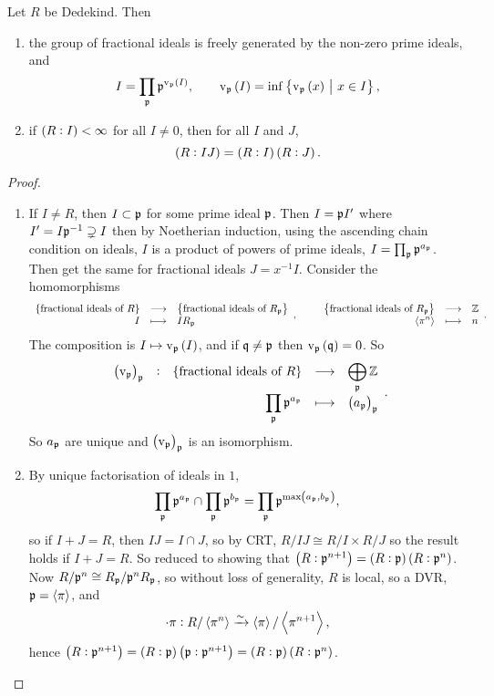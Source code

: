 \begin{theorem}
Let $ R $ be Dedekind. Then
\begin{enumerate}
\item the group of fractional ideals is freely generated by the non-zero prime ideals, and
$$ I = \prod_\ppp \ppp^{\v_\ppp\br{I}}, \qquad \v_\ppp\br{I} = \inf \cbr{\v_\ppp\br{x} \st x \in I}, $$
\item if $ \br{R : I} < \infty $ for all $ I \ne 0 $, then for all $ I $ and $ J $,
$$ \br{R : IJ} = \br{R : I}\br{R : J}. $$
\end{enumerate}
\end{theorem}

\begin{proof}
\hfill
\begin{enumerate}
\item If $ I \ne R $, then $ I \subset \mathfrak{p} $ for some prime ideal $ \mathfrak{p} $. Then $ I = \mathfrak{p} I' $ where $ I' = I\mathfrak{p}^{-1} \supsetneq I $ then by Noetherian induction, using the ascending chain condition on ideals, $ I $ is a product of powers of prime ideals, $ I = \prod_{\mathfrak{p}} \mathfrak{p}^{a_{\mathfrak{p}}} $. Then get the same for fractional ideals $ J = x^{-1}I $. Consider the homomorphisms
$$ \function{\cbr{\text{fractional ideals of} \ R}}{\cbr{\text{fractional ideals of} \ R_\ppp}}{I}{IR_\ppp}, \qquad \function{\cbr{\text{fractional ideals of} \ R_\ppp}}{\ZZ}{\abr{\pi^n}}{n}. $$
The composition is $ I \mapsto \v_\ppp\br{I} $, and if $ \mathfrak{q} \ne \mathfrak{p} $ then $ \v_\ppp\br{\qqq} = 0 $. So
$$ \function[\br{\v_\ppp}_\ppp]{\cbr{\text{fractional ideals of} \ R}}{\bigoplus_\ppp \ZZ}{\prod_\ppp \ppp^{a_\ppp}}{\br{a_\ppp}_\ppp}. $$
So $ a_{\mathfrak{p}} $ are unique and $ \br{\v_\ppp}_\ppp $ is an isomorphism.


\item By unique factorisation of ideals in $ 1 $,
$$ \prod_\ppp \ppp^{a_\ppp} \cap \prod_\ppp \ppp^{b_\ppp} = \prod_\ppp \ppp^{\max\br{a_\ppp, b_\ppp}}, $$
so if $ I + J = R $, then $ IJ = I \cap J $, so by CRT, $ R / IJ \cong R / I \times R / J $ so the result holds if $ I + J = R $. So reduced to showing that $ \br{R : \ppp^{n + 1}} = \br{R : \ppp}\br{R : \ppp^n} $. Now $ R / \mathfrak{p}^n \cong R_{\mathfrak{p}} / \mathfrak{p}^nR_{\mathfrak{p}} $, so without loss of generality, $ R $ is local, so a DVR, $ \mathfrak{p} = \left\langle \pi \right\rangle $, and
$$ \cdot \pi : R / \left\langle \pi^n \right\rangle \xrightarrow{\sim} \left\langle \pi \right\rangle / \left\langle \pi^{n + 1} \right\rangle, $$
hence $ \br{R : \ppp^{n + 1}} = \br{R : \ppp}\br{\ppp : \ppp^{n + 1}} = \br{R : \ppp}\br{R : \ppp^n} $.
\end{enumerate}
\end{proof}

